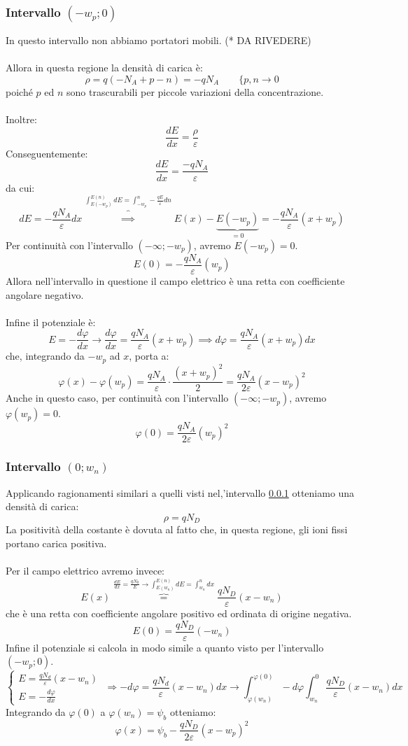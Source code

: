 \documentclass[../main.tex]{subfiles}
\begin{document}
	\subsubsection{Intervallo $(-w_p; 0)$}
	\label{subsub:int-pn3}
	In questo intervallo non abbiamo portatori mobili. ({\color{red}* DA RIVEDERE})\\\\
	Allora in questa regione la densità di carica è:
	$$\rho = q(-N_A + p - n) = -qN_A \qquad \{ p,n \to 0$$
	poiché $p$ ed $n$ sono trascurabili per piccole variazioni della concentrazione.\\\\
	Inoltre:
	$$\frac{dE}{dx} = \frac{\rho}{\varepsilon}$$
	Conseguentemente:
	$$\frac{dE}{dx} = \frac{-qN_A}{\varepsilon}$$
	da cui:
	$$dE = -\frac{qN_A}{\varepsilon}dx \overbrace{\implies}^{\int_{E(-w_p)}^{E(n)} dE = \int_{-w_p}^{n} - \frac{qE}{\varepsilon} dn} E(x) - \underbrace{E(-w_p)}_{=0} = -\frac{qN_A}{\varepsilon}(x + w_p)$$
	Per continuità con l’intervallo $(-\infty; -w_p)$, avremo $E(-w_p) = 0$.
	$$E(0) = -\frac{qN_A}{\varepsilon}(w_p)$$
	Allora nell’intervallo in questione il campo elettrico è una retta con coefficiente angolare negativo.\\\\
	Infine il potenziale è:
	$$E = - \frac{d \varphi}{dx} \rightarrow \frac{d\varphi}{dx} = \frac{qN_A}{\varepsilon}(x + w_p) \implies d\varphi = \frac{qN_A}{\varepsilon}(x + w_p)dx$$
	che, integrando da $-w_p$ ad $x$, porta a:
	$$\varphi(x) - \varphi(w_p) = \frac{qN_A}{\varepsilon} \cdot \frac{(x + w_p)^2}{2} = \frac{qN_A}{2\varepsilon}(x - w_p)^2$$
	Anche in questo caso, per continuità con l’intervallo $(-\infty; -w_p)$, avremo $\varphi(w_p) = 0$.
	$$\varphi(0) = \frac{qN_A}{2\varepsilon}(w_p)^2$$
	\subsubsection{Intervallo $(0; w_n)$}
	\label{subsub:int-pn4}
	Applicando ragionamenti similari a quelli visti nel,'intervallo \ref{subsub:int-pn3} otteniamo una densità di carica:
	$$\rho = qN_D$$
	La positività della costante è dovuta al fatto che, in questa regione, gli ioni fissi portano carica positiva.\\\\
	Per il campo elettrico avremo invece:
	$$E\left(x\right)\overbrace{=}^{\frac{dE}{dx}=\frac{qN_{0}}{E}\rightarrow\int_{E(w_n)}^{E(n)} dE=\int_{w_n}^{n}dx}\frac{qN_D}{\varepsilon}\left(x-w_n\right)$$
	che è una retta con coefficiente angolare positivo ed ordinata di origine negativa.
	$$E\left(0\right)=\frac{qN_D}{\varepsilon}\left(-w_n\right)$$
	Infine il potenziale si calcola in modo simile a quanto visto per l’intervallo $(-w_p; 0)$.
	$$\begin{cases} E=\frac{qN_d}{\varepsilon}\left(x-w_n\right) \\ E=-\frac{d\varphi}{dx}\end{cases}
	\;
	\Rightarrow-d\varphi=\frac{qN_d}{\varepsilon}\left(x-w_n\right)dx
	\rightarrow \int_{\varphi(w_{n})}^{\varphi(0)} -d\varphi \int_{w_{n}}^{0}\frac{q N_D}{\varepsilon}\left(x-w_{n}\right)dx$$
	Integrando da $\varphi\left(0\right)$ a $\varphi\left(w_n\right)=\psi_b$ otteniamo:
	$$\varphi\left(x\right)=\psi_b-\frac{qN_D}{2\varepsilon}\left(x-w_p\right)^2$$
\end{document}

